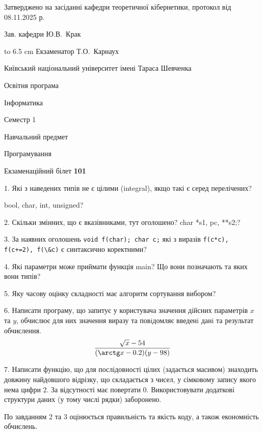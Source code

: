 \documentclass[12pt, ukrainian]{article}
\def\code#1{\Verb!#1!}
\begin{document}
{\smallskip\smallskip \begin {scriptsize} Затверджено на засіданні кафедри теоретичної кібернетики, протокол   від   08.11.2025 р.\par\smallskip\smallskip\smallskip\smallskip
{\parbox {6.5 cm} {Зав. кафедри \dotfill Ю.В.~Крак}}\hspace {0.7cm} {\hbox to 6.5 cm { Екзаменатор \dotfill Т.О.~Карнаух}} \end{scriptsize}}
\newpage
{{\begin {scriptsize}\par
{ \center  Київський національний університет імені Тараса Шевченка \par}
{\parbox {5 cm}{Освітня програма \hfill}{\parbox {7 cm}{Інформатика\hfill}}\parbox {6 cm}{\hfill Семестр 1}}\par
{\parbox {5 cm} {Навчальний предмет \hfill}\parbox {7 cm}{Програмування \hfill}\parbox {6cm}{\hfill}\par}\vspace{-15pt} \end{scriptsize}}{\center Екзаменаційний білет \No \textbf { 101 }\par}}
{%
1. Які з наведених типів не є цілими (integral), якщо такі є серед перелічених?

bool, char, int, unsigned?
\par
\vspace{2mm}
2. Скільки змінних, що є вказівниками, тут оголошено?
char *s1, pc, **s2;?
\par
\vspace{2mm}
3. За наявних оголошень \code{void f(char); char c;} які з виразів \code{f(c*c), f(c+=2), f(\&c)} є синтаксично коректними?
\par
\vspace{2mm}
4. Які параметри може приймати функція main? Що вони позначають та яких вони типів?
\par
\vspace{2mm}
5. Яку часову оцінку складності має алгоритм сортування вибором?
\par
\vspace{2mm}
6. Написати програму, що запитує у користувача значення дійсних параметрів $x$ та $y$, обчислює для них значення виразу та повiдомляє введенi данi та результат обчислення.
$$\frac{\sqrt x - 54}{(\arctg x - 0.2) (y - 98)}$$ 

\par
7. Написати функцію, що для послідовності цілих (задається масивом) знаходить довжину найдовшого відрізку, що складається з чисел, у сімковому запису якого нема цифри 2. За відсутності має повертати $0$. Використовувати додаткові структури даних (у тому числі рядки) заборонено.

По завданням 2 та 3 оцінюється правильність та якість коду, а також економність обчислень.

}
\end{document}
